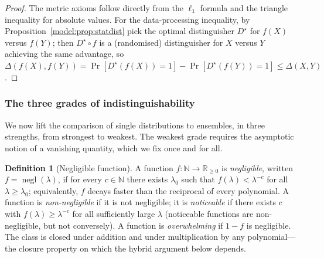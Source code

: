 \documentclass[11pt,a4paper]{article}
\theoremstyle{definition}
\newtheorem{definition}[theorem]{Definition}
\theoremstyle{remark}
\newcommand{\N}{\ensuremath{\mathbb{N}}}
\newcommand{\R}{\ensuremath{\mathbb{R}}}
\DeclareMathOperator{\negl}{negl}
\begin{document}
\begin{proof}
The metric axioms follow directly from the \(\ell_1\) formula and the triangle
inequality for absolute values. For the data-processing inequality, by
Proposition~\ref{model:prop:statdist} pick the optimal distinguisher \(D^\star\)
for \(f(X)\) versus \(f(Y)\); then \(D^\star \circ f\) is a (randomised)
distinguisher for \(X\) versus \(Y\) achieving the same advantage, so
\(\Delta(f(X),f(Y)) = \Pr[D^\star(f(X))=1]-\Pr[D^\star(f(Y))=1] \leq
\Delta(X,Y)\).
\end{proof}

\subsubsection{The three grades of indistinguishability}

We now lift the comparison of single distributions to ensembles, in three
strengths, from strongest to weakest. The weakest grade requires the asymptotic
notion of a vanishing quantity, which we fix once and for all.

\begin{definition}[Negligible function]\label{model:def:negl}
A function \(f \colon \N \to \R_{\ge 0}\) is \emph{negligible}, written
\(f = \negl(\lambda)\), if for every \(c \in \N\) there exists \(\lambda_0\)
such that \(f(\lambda) < \lambda^{-c}\) for all \(\lambda \ge \lambda_0\);
equivalently, \(f\) decays faster than the reciprocal of every polynomial. A
function is \emph{non-negligible} if it is not negligible; it is
\emph{noticeable} if there exists \(c\) with \(f(\lambda) \ge \lambda^{-c}\)
for all sufficiently large \(\lambda\) (noticeable functions are
non-negligible, but not conversely). A function is
\emph{overwhelming} if \(1 - f\) is negligible. The class is closed under
addition and under multiplication by any polynomial---the closure property on
which the hybrid argument below depends.
\end{definition}
\end{document}

